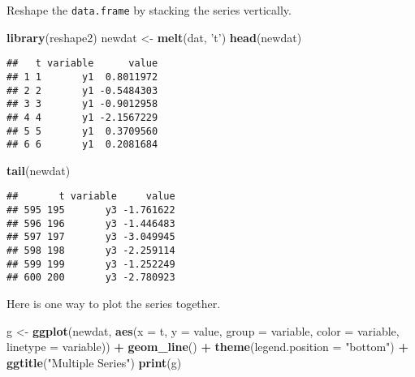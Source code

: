 \documentclass[]{article}
\newenvironment{Shaded}{\begin{snugshade}}{\end{snugshade}}
\newcommand{\KeywordTok}[1]{\textcolor[rgb]{0.13,0.29,0.53}{\textbf{#1}}}
\newcommand{\DataTypeTok}[1]{\textcolor[rgb]{0.13,0.29,0.53}{#1}}
\newcommand{\StringTok}[1]{\textcolor[rgb]{0.31,0.60,0.02}{#1}}
\newcommand{\OperatorTok}[1]{\textcolor[rgb]{0.81,0.36,0.00}{\textbf{#1}}}
\newcommand{\NormalTok}[1]{#1}
\begin{document}
Reshape the \texttt{data.frame} by stacking the series vertically.

\begin{Shaded}
\begin{Highlighting}[]
\KeywordTok{library}\NormalTok{(reshape2)}
\NormalTok{newdat <-}\StringTok{ }\KeywordTok{melt}\NormalTok{(dat, }\StringTok{'t'}\NormalTok{)}
\KeywordTok{head}\NormalTok{(newdat)}
\end{Highlighting}
\end{Shaded}

\begin{verbatim}
##   t variable      value
## 1 1       y1  0.8011972
## 2 2       y1 -0.5484303
## 3 3       y1 -0.9012958
## 4 4       y1 -2.1567229
## 5 5       y1  0.3709560
## 6 6       y1  0.2081684
\end{verbatim}

\begin{Shaded}
\begin{Highlighting}[]
\KeywordTok{tail}\NormalTok{(newdat)}
\end{Highlighting}
\end{Shaded}

\begin{verbatim}
##       t variable     value
## 595 195       y3 -1.761622
## 596 196       y3 -1.446483
## 597 197       y3 -3.049945
## 598 198       y3 -2.259114
## 599 199       y3 -1.252249
## 600 200       y3 -2.780923
\end{verbatim}

Here is one way to plot the series together.

\begin{Shaded}
\begin{Highlighting}[]
\NormalTok{g <-}\StringTok{ }\KeywordTok{ggplot}\NormalTok{(newdat, }\KeywordTok{aes}\NormalTok{(}\DataTypeTok{x =}\NormalTok{ t, }\DataTypeTok{y =}\NormalTok{ value,}
            \DataTypeTok{group =}\NormalTok{ variable,}
            \DataTypeTok{color =}\NormalTok{ variable,}
            \DataTypeTok{linetype =}\NormalTok{ variable)) }\OperatorTok{+}
\StringTok{    }\KeywordTok{geom_line}\NormalTok{() }\OperatorTok{+}
\StringTok{    }\KeywordTok{theme}\NormalTok{(}\DataTypeTok{legend.position =} \StringTok{"bottom"}\NormalTok{) }\OperatorTok{+}
\StringTok{    }\KeywordTok{ggtitle}\NormalTok{(}\StringTok{"Multiple Series"}\NormalTok{)}
\KeywordTok{print}\NormalTok{(g)}
\end{Highlighting}
\end{Shaded}
\end{document}
